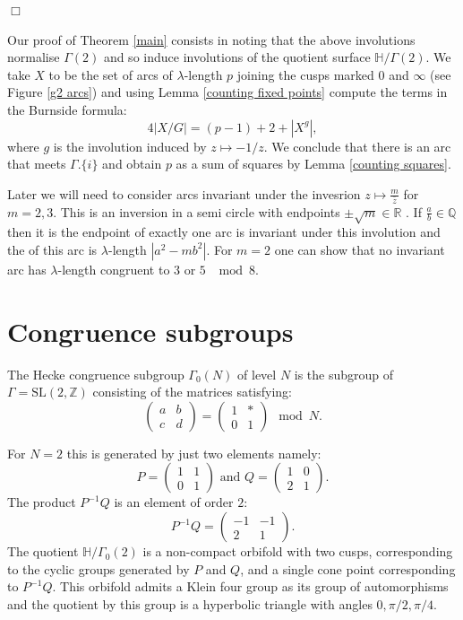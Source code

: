\documentclass[12pt,a4paper]{amsart}
\def\HH{\mathbb{H}}
\def\oo{\HH / \Gamma_0(2)}
\def\g2{\Gamma(2)}
\def\xx{\HH/\g2}
\def\ZZ{\mathbb{Z}}
\begin{document}
\hfill $\Box$

Our proof  of Theorem \ref{main} consists in noting that the above involutions normalise $\g2$
and so induce involutions of the quotient surface $\xx$.
We take $X$ to be the set of arcs of $\lambda$-length $p$ joining
the cusps marked $0$ and $\infty$ (see Figure \ref{g2 arcs})
and using Lemma \ref{counting fixed points} compute the terms in the
Burnside formula:
$$
4 |X/G|   = (p-1) + 2 + |X^g|,$$
	where $g$ is the involution induced by $z\mapsto -1 /
	z.$
We conclude that there is an arc that meets $\Gamma.\{i\}$ and obtain
$p$ as a sum of squares by Lemma \ref{counting squares}.




Later we will need to consider arcs invariant under the invesrion
$z\mapsto \frac{m}{\bar{z}}$ for $m=2,3$.
This is an inversion in a semi circle with endpoints $\pm \sqrt{m}
\in \mathbb{R}$ .
If $\frac{a}{b}\in \mathbb{Q}$ then it is the endpoint of exactly
one  arc is invariant under this involution and the
of this arc is $\lambda$-length $|a^2 - m b^2|$.
For $m=2$ one can show 
that no invariant arc has $\lambda$-length congruent to $3$ or $5$
$\mod 8$.



\section{Congruence subgroups}

The Hecke congruence subgroup $\Gamma_0(N)$ of level $N$ is the subgroup of
$\Gamma = \mathrm{SL}(2,\ZZ)$ 
consisting of the matrices satisfying:
$$ \begin{pmatrix} a & b \\ c & d \end{pmatrix} = 
\begin{pmatrix} 1 & * \\ 0 & 1 \end{pmatrix} \mod N.$$

For $N=2$ this is generated by just two elements namely:
$$ P = \begin{pmatrix} 1 & 1 \\ 0 & 1 \end{pmatrix} \text{ and } Q=  \begin{pmatrix} 1 & 0 \\ 2 & 1 \end{pmatrix}.$$
The product $P^{-1}Q$ is an element of order $2$:
$$ P^{-1}Q = \begin{pmatrix} -1 & -1 \\ 2 & 1 \end{pmatrix}.$$
The quotient $\oo$ is a non-compact orbifold with two cusps,
corresponding to the cyclic groups generated by $P$ and $Q$, and a
single cone point corresponding to $P^{-1}Q$.
This orbifold admits a Klein four group as its group of
automorphisms
and the quotient by this group is a hyperbolic triangle with angles
$0, \pi/2, \pi/4$.
\end{document}
